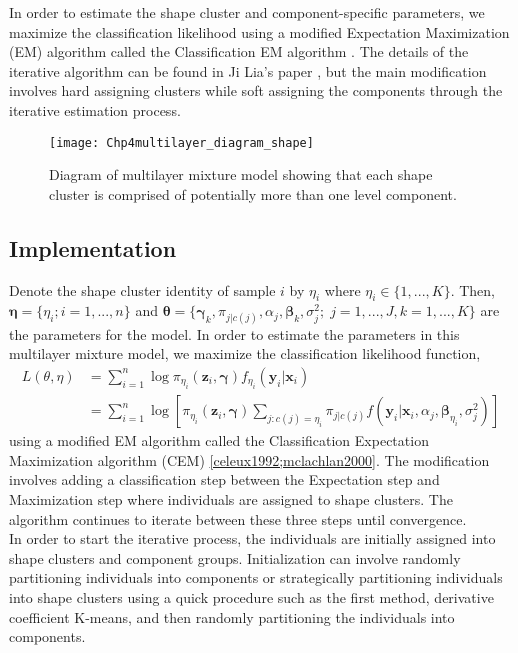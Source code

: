 \documentclass[12pt]{article}
\newcommand{\B}[0]{\mathbf}
\newcommand{\bs}[0]{\boldsymbol}
\begin{document}
In order to estimate the shape cluster and component-specific parameters, we maximize the classification likelihood using a modified Expectation Maximization (EM) algorithm \cite{dempster1977} called the Classification EM algorithm \cite{mclachlan2000}. The details of the iterative algorithm can be found in Ji Lia's paper \cite{li2005}, but the main modification involves hard assigning clusters while soft assigning the components through the iterative estimation process.
\begin{figure}[h]
\begin{center}
\texttt{[image: Chp4multilayer\_diagram\_shape]}
\end{center}
\label{fig:diashape}
\caption{Diagram of multilayer mixture model showing that each shape cluster is comprised of potentially more than one level component.}
\end{figure}
\subsection{Implementation}
Denote the shape cluster identity of sample $i$ by $\eta_{i}$ where $\eta_{i}\in\{1,...,K\}$. Then, $\bs\eta = \{\eta_{i}; i=1,...,n\}$ and $\bs\theta=\{\bs \gamma_{k}, \pi_{j|c(j)},\alpha_{j}, \bs\beta_{k},\sigma^{2}_{j};\; j=1,...,J, k=1,...,K\}$ are the parameters for the model. In order to estimate the parameters in this multilayer mixture model, we maximize the classification likelihood function, \cite{mclachlan2000}
\begin{align}
 L(\theta,\eta) &= \sum^{n}_{i=1} \log \pi_{\eta_{i}}(\B z_{i},\bs\gamma) f_{\eta_{i}}(\B y_{i}|\B x_{i})\\
\label{ll}& =  \sum^{n}_{i=1} \log\left[ \pi_{\eta_{i}}(\B z_{i},\bs\gamma)  \sum_{j: c(j) = \eta_{i}} \pi_{j|c(j)}f(\B y_{i}|\B x_{i},\alpha_{j},\bs\beta_{\eta_{i}},\sigma^{2}_{j})\right]
\end{align} 
using a modified EM algorithm called the Classification Expectation Maximization algorithm (CEM) \ref{celeux1992;mclachlan2000}. The modification involves adding a classification step between the Expectation step and Maximization step where individuals are assigned to shape clusters. The algorithm continues to iterate between these three steps until convergence.\\

In order to start the iterative process, the individuals are initially assigned into shape clusters and component groups. Initialization can involve randomly partitioning individuals into components or strategically partitioning individuals into shape clusters using a quick procedure such as the first method, derivative coefficient K-means, and then randomly partitioning the individuals into components. \\
\end{document}
